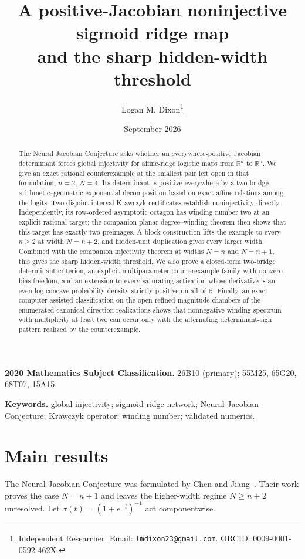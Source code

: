 \documentclass[11pt]{article}
\title{A positive-Jacobian noninjective sigmoid ridge map\\and the sharp hidden-width threshold}
\author{Logan M. Dixon\thanks{Independent Researcher. Email: \texttt{lmdixon23@gmail.com}. ORCID: 0009-0001-0592-462X.}}
\date{September 2026}
\theoremstyle{remark}
\newcommand{\R}{\mathbb R}
\begin{document}
\maketitle

\begin{abstract}
The Neural Jacobian Conjecture asks whether an everywhere-positive Jacobian determinant forces global injectivity for affine-ridge logistic maps from $\R^n$ to $\R^n$. We give an exact rational counterexample at the smallest pair left open in that formulation, $n=2$, $N=4$. Its determinant is positive everywhere by a two-bridge arithmetic--geometric-exponential decomposition based on exact affine relations among the logits. Two disjoint interval Krawczyk certificates establish noninjectivity directly. Independently, its row-ordered asymptotic octagon has winding number two at an explicit rational target; the companion planar degree--winding theorem then shows that this target has exactly two preimages. A block construction lifts the example to every $n\ge2$ at width $N=n+2$, and hidden-unit duplication gives every larger width. Combined with the companion injectivity theorem at widths $N=n$ and $N=n+1$, this gives the sharp hidden-width threshold. We also prove a closed-form two-bridge determinant criterion, an explicit multiparameter counterexample family with nonzero bias freedom, and an extension to every saturating activation whose derivative is an even log-concave probability density strictly positive on all of $\R$. Finally, an exact computer-assisted classification on the open refined magnitude chambers of the enumerated canonical direction realizations shows that nonnegative winding spectrum with multiplicity at least two can occur only with the alternating determinant-sign pattern realized by the counterexample.
\end{abstract}

\medskip
\noindent\textbf{2020 Mathematics Subject Classification.} 26B10 (primary); 55M25, 65G20, 68T07, 15A15.

\smallskip
\noindent\textbf{Keywords.} global injectivity; sigmoid ridge network; Neural Jacobian Conjecture; Krawczyk operator; winding number; validated numerics.

\section{Main results}
The Neural Jacobian Conjecture was formulated by Chen and Jiang~\cite{ChenJiang}. Their work proves the case $N=n+1$ and leaves the higher-width regime $N\ge n+2$ unresolved. Let $\sigma(t)=(1+e^{-t})^{-1}$ act componentwise.
\end{document}
